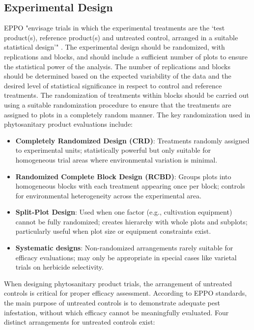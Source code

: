 \documentclass[12pt,a4paper,oneside]{report}
\begin{document}
\subsection{Experimental Design}

EPPO "envisage trials in which the experimental
treatments are the ‘test product(s), reference product(s) and
untreated control, arranged in a suitable statistical design’" \cite{EPPO_PP1_152}.
The experimental design should be randomized, with replications and blocks, and
should include a sufficient number of plots to ensure the statistical power of the
analysis. The number of replications and blocks should be determined based on the
expected variability of the data and the desired level of statistical significance
in respect to control and reference treatments. The
randomization of treatments within blocks should be carried out using a suitable
randomization procedure to ensure that the treatments are assigned to plots in a
completely random manner. The key randomization used in phytosanitary product 
evaluations include:

\begin{itemize}
    \item \textbf{Completely Randomized Design (CRD)}: Treatments randomly assigned to 
          experimental units; statistically powerful but only suitable for homogeneous trial 
          areas where environmental variation is minimal.
          
    \item \textbf{Randomized Complete Block Design (RCBD)}: Groups plots into homogeneous 
          blocks with each treatment appearing once per block; controls for environmental 
          heterogeneity across the experimental area.
          
    \item \textbf{Split-Plot Design}: Used when one factor (e.g., cultivation equipment) 
          cannot be fully randomized; creates hierarchy with whole plots and subplots; 
          particularly useful when plot size or equipment constraints exist.
          
    \item \textbf{Systematic designs}: Non-randomized arrangements rarely suitable for 
          efficacy evaluations; may only be appropriate in special cases like varietal 
          trials on herbicide selectivity.
\end{itemize}

When designing phytosanitary product trials, the arrangement of untreated controls 
is critical for proper efficacy assessment. According to EPPO standards, the main 
purpose of untreated controls is to demonstrate adequate pest infestation, without 
which efficacy cannot be meaningfully evaluated. Four distinct arrangements for 
untreated controls exist:
\end{document}
